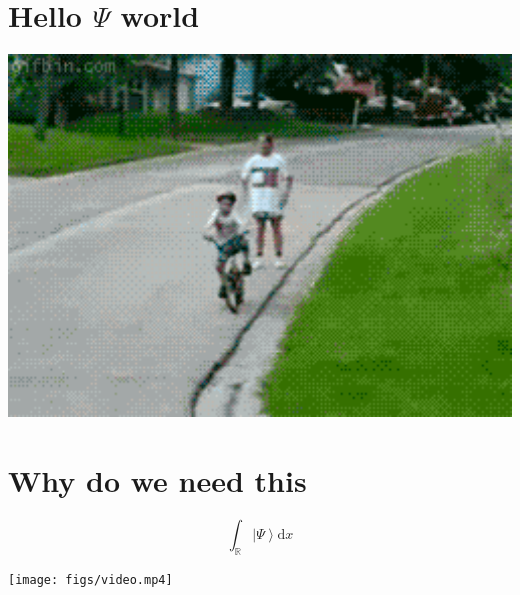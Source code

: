 \documentclass[A4paper, 12pt]{beamer}
\begin{document}
\section{Hello $ \Psi $ world} %

\includegraphics[width=200in]{figs/fun.gif}

\section{Why do we need this} %

%
\[
  \int_{\mathbb{R}} \left | \Psi \right \rangle  \mathrm{d} x
\]
%

\texttt{[image: figs/video.mp4]}
\end{document}
